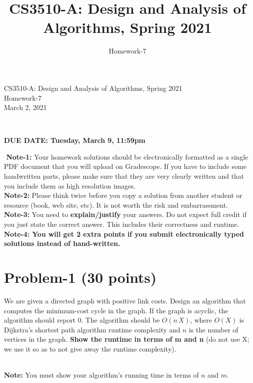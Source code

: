 \documentclass[11pt]{article}
\title{CS3510-A: Design and Analysis of Algorithms, Spring 2021}
\author{Homework-7}
\begin{document}
\begin{center}
    
    \LARGE CS3510-A: Design and Analysis of Algorithms, Spring 2021 \\ \vspace{1em} 
    \large Homework-7 \\ \vspace{0.5em}
    March 2, 2021
\end{center}
\thispagestyle{empty}
\pagestyle{empty}
​
\noindent
\begin{center}
{\bf DUE DATE: Tuesday, March 9, 11:59pm}
\end{center}
​
\noindent
{\bf Note-1:} Your homework solutions should be electronically formatted as a single PDF document that you will upload on Gradescope. 
If you have to include some handwritten parts, please make sure that they are very clearly written and that you include them as high resolution images. \\
​
\noindent
{\bf Note-2:} Please think twice before you copy a solution from another student or resource (book, web site, etc). 
It is not worth the risk and embarrassment. \\
​
\noindent
{\bf Note-3:} You need to {\bf explain/justify} your answers. Do not expect full credit if you just state the correct answer. This includes their correctness and runtime.\\
​
\noindent
{\bf Note-4: You will get 2 extra points if you submit electronically typed solutions instead of hand-written.} 
​
\newpage
\section*{Problem-1 (30 points)}

We are given a directed graph with positive link costs. Design an algorithm that computes the minimum-cost cycle in the graph. If the graph is acyclic, the algorithm should report 0. The algorithm should be $O(n \, X)$, where $O(X)$ is Dijkstra’s shortest path algorithm runtime complexity and $n$ is the number of vertices in the graph. \textbf{Show the runtime in terms of m and n} (do not use X; we use it so as to not give away the runtime complexity).

~\\
\noindent
\textbf{Note:} You must show your algorithm's running time in terms of $n$ and $m$. \\
\end{document}
